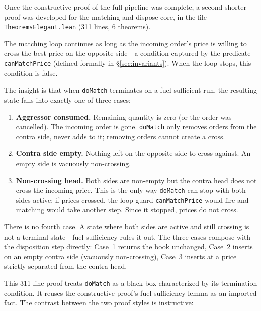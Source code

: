 \documentclass[11pt,a4paper]{article}
\begin{document}
Once the constructive proof of the full pipeline was complete, a second
shorter proof was developed for the matching-and-dispose core, in the
file \texttt{TheoremsElegant.lean} (311 lines, 6 theorems).

The matching loop continues as long as the incoming order's price is
willing to cross the best price on the opposite side---a condition
captured by the predicate \texttt{canMatchPrice} (defined formally in
\S\ref{sec:invariants}). When the loop stops, this condition is false.

The insight is that when \texttt{doMatch} terminates on a
fuel-sufficient run, the resulting state falls into exactly one of
three cases:

\begin{enumerate}[nosep]
\item \textbf{Aggressor consumed.} Remaining quantity is zero (or the
      order was cancelled). The incoming order is gone.
      \texttt{doMatch} only removes orders from the contra side, never
      adds to it; removing orders cannot create a cross.

\item \textbf{Contra side empty.} Nothing left on the opposite side to
      cross against. An empty side is vacuously non-crossing.

\item \textbf{Non-crossing head.} Both sides are non-empty but the
      contra head does not cross the incoming price. This is the only
      way \texttt{doMatch} can stop with both sides active: if prices
      crossed, the loop guard \texttt{canMatchPrice} would fire and
      matching would take another step. Since it stopped, prices do not
      cross.
\end{enumerate}

There is no fourth case. A state where both sides are active and still
crossing is not a terminal state---fuel sufficiency rules it out. The
three cases compose with the disposition step directly: Case~1 returns
the book unchanged, Case~2 inserts on an empty contra side (vacuously
non-crossing), Case~3 inserts at a price strictly separated from the
contra head.

This 311-line proof treats \texttt{doMatch} as a black box
characterized by its termination condition. It reuses the constructive
proof's fuel-sufficiency lemma as an imported fact. The contrast
between the two proof styles is instructive:
\end{document}

